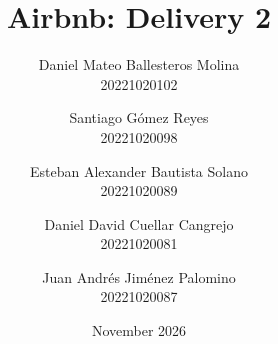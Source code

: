 \documentclass[12pt,a4paper]{article}
\renewcommand{\_}{\origunderscore\allowbreak}
\begin{document}
\title{Airbnb: Delivery 2}
\author{Daniel Mateo Ballesteros Molina \\ 20221020102
\and Santiago Gómez Reyes \\ 20221020098
\and Esteban Alexander Bautista Solano \\ 20221020089
\and Daniel David Cuellar Cangrejo \\ 20221020081
\and Juan Andrés Jiménez Palomino \\ 20221020087}
\date{November 2026}

\maketitle

\tableofcontents

















\printbibliography
\end{document}
